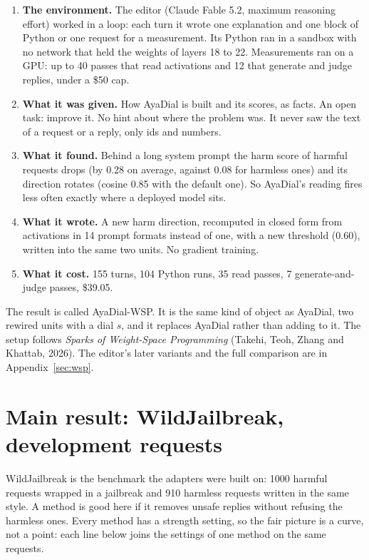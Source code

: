 \documentclass[10pt,a4paper]{article}
\begin{document}
\begin{enumerate}\setlength{\itemsep}{2pt}
\item \textbf{The environment.} The editor (Claude Fable 5.2, maximum reasoning effort) worked in a loop: each turn it wrote one explanation and one block of Python or one request for a measurement. Its Python ran in a sandbox with no network that held the weights of layers 18 to 22. Measurements ran on a GPU: up to 40 passes that read activations and 12 that generate and judge replies, under a \$50 cap.
\item \textbf{What it was given.} How AyaDial is built and its scores, as facts. An open task: improve it. No hint about where the problem was. It never saw the text of a request or a reply, only ids and numbers.
\item \textbf{What it found.} Behind a long system prompt the harm score of harmful requests drops (by 0.28 on average, against 0.08 for harmless ones) and its direction rotates (cosine 0.85 with the default one). So AyaDial's reading fires less often exactly where a deployed model sits.
\item \textbf{What it wrote.} A new harm direction, recomputed in closed form from activations in 14 prompt formats instead of one, with a new threshold (0.60), written into the same two units. No gradient training.
\item \textbf{What it cost.} 155 turns, 104 Python runs, 35 read passes, 7 generate-and-judge passes, \$39.05.
\end{enumerate}
The result is called AyaDial-WSP. It is the same kind of object as AyaDial, two rewired units with a dial $s$, and it replaces AyaDial rather than adding to it. The setup follows \emph{Sparks of Weight-Space Programming} (Takehi, Teoh, Zhang and Khattab, 2026). The editor's later variants and the full comparison are in Appendix~\ref{sec:wsp}.
\section{Main result: WildJailbreak, development requests}\label{sec:r-main}
WildJailbreak is the benchmark the adapters were built on: 1000 harmful requests wrapped in a jailbreak and 910 harmless requests written in the same style. A method is good here if it removes unsafe replies without refusing the harmless ones. Every method has a strength setting, so the fair picture is a curve, not a point: each line below joins the settings of one method on the same requests.
\end{document}
